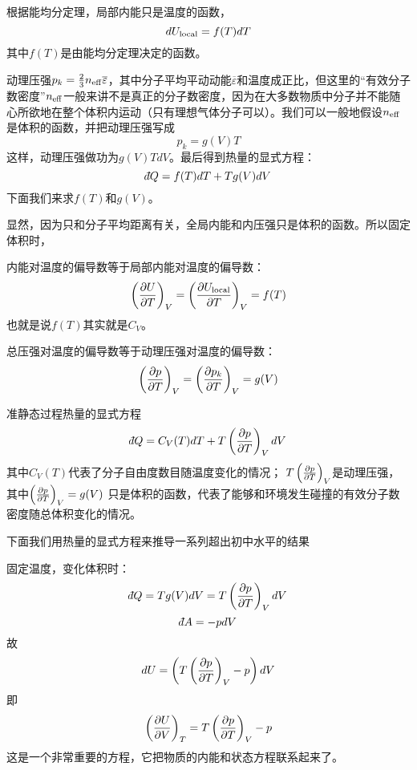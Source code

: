 \documentclass[CJK]{beamer}
\begin{document}
\begin{frame}
\bch
根据能均分定理，{\blue 局部内能只是温度的函数}，
$$d U_{\rm local} = f(T) dT$$
其中$f(T)$是由能均分定理决定的函数。

\skipline

动理压强$p_k = \frac{2}{3}n_{\rm eff}\overline{\varepsilon}$，其中分子平均平动动能$\overline{\varepsilon}$和温度成正比，但这里的“有效分子数密度”$n_{\rm eff}$一般来讲不是真正的分子数密度，因为在大多数物质中分子并不能随心所欲地在整个体积内运动（只有理想气体分子可以）。我们可以一般地假设$n_{\rm eff}$是体积的函数，并把动理压强写成
{\blue
$$ p_k = g(V) T$$}
这样，动理压强做功为$g(V)T dV$。最后得到热量的显式方程：$$\dbar Q = f(T)dT + Tg(V) dV$$
下面我们来求$f(T)$和$g(V)$。

\ech
\end{frame}



\begin{frame}
\bch
显然，因为只和分子平均距离有关，{\blue 全局内能和内压强只是体积的函数}。所以固定体积时，

\bitem
\item{内能对温度的偏导数等于局部内能对温度的偏导数：
$$ \left(\frac{\partial U}{\partial T}\right)_{V} = \left(\frac{\partial U_{\rm local}}{\partial T}\right)_{V} = f(T) $$
也就是说$f(T)$其实就是$C_V$。}
\item{
总压强对温度的偏导数等于动理压强对温度的偏导数：
$$\left(\frac{\partial p}{\partial T}\right)_{V} = \left(\frac{\partial p_k}{\partial T}\right)_{V} = g(V)$$}
\eitem
\ech
\end{frame}

\begin{frame}
\bch
准静态过程热量的显式方程
\tbox
{\blue $$\dbar Q = C_V(T)dT + T \pfrac pTV dV$$}
其中$C_V(T)$代表了分子自由度数目随温度变化的情况；
$T\left(\frac{\partial p}{\partial T}\right)_{V}$是动理压强，其中$\left(\frac{\partial p}{\partial T}\right)_{V}  = g(V)$
只是体积的函数，代表了能够和环境发生碰撞的有效分子数密度随总体积变化的情况。

\ech
\end{frame}

\begin{frame}
\bch

下面我们用热量的显式方程来推导一系列超出初中水平的结果

\ech
\end{frame}


\begin{frame}
\bch
固定温度，变化体积时：
$$\dbar Q = T g(V)dV = T\pfrac pTV dV$$
$$\dbar A = -pdV$$
故
$$dU = \left(T \left(\frac{\partial p}{\partial T}\right)_{V} - p\right)dV$$
即{\blue
$$\left(\frac{\partial U}{\partial V}\right)_{T} = T \left(\frac{\partial p}{\partial T}\right)_{V} - p$$
}
这是一个非常重要的方程，它把物质的内能和状态方程联系起来了。
\ech
\end{frame}
\end{document}
